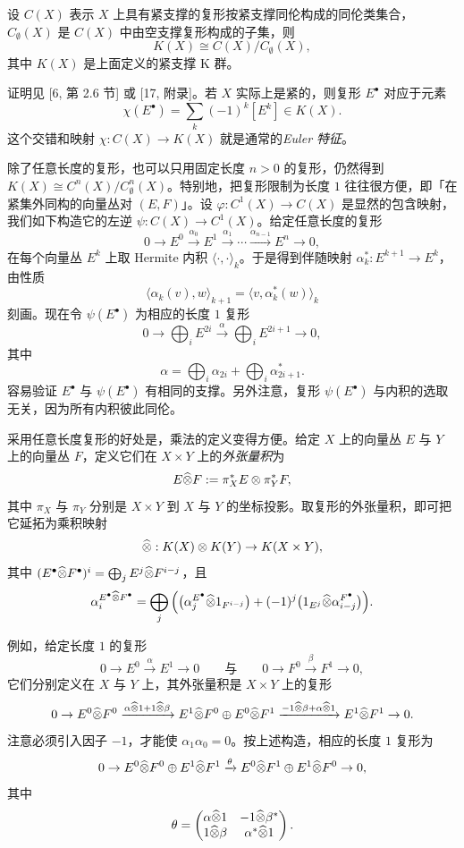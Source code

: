 \begin{claim}
设 $C(X)$ 表示 $X$ 上具有紧支撑的复形按紧支撑同伦构成的同伦类集合，$C_\emptyset(X)$ 是 $C(X)$ 中由空支撑复形构成的子集，则
\[
K(X)\cong C(X)/C_\emptyset(X),
\]
其中 $K(X)$ 是上面定义的紧支撑 K 群。
\end{claim}

证明见 [6, 第 2.6 节] 或 [17, 附录]。若 $X$ 实际上是紧的，则复形 $E^\bullet$ 对应于元素
\[
\chi(E^\bullet)=\sum_k(-1)^k[E^k]\in K(X).
\]
这个交错和映射 $\chi:C(X)\to K(X)$ 就是通常的\emph{Euler 特征}。

除了任意长度的复形，也可以只用固定长度 $n>0$ 的复形，仍然得到 $K(X)\cong C^n(X)/C^n_\emptyset(X)$。特别地，把复形限制为长度 $1$ 往往很方便，即「在紧集外同构的向量丛对 $(E,F)$」。设 $\varphi:C^1(X)\to C(X)$ 是显然的包含映射，我们如下构造它的左逆 $\psi:C(X)\to C^1(X)$。给定任意长度的复形
\[
0\to E^0\xrightarrow{\alpha_0}E^1\xrightarrow{\alpha_1}\cdots
\xrightarrow{\alpha_{n-1}}E^n\to0,
\]
在每个向量丛 $E^k$ 上取 Hermite 内积 $\langle\cdot,\cdot\rangle_k$。于是得到伴随映射 $\alpha_k^*:E^{k+1}\to E^k$，由性质
\[
\langle\alpha_k(v),w\rangle_{k+1}=\langle v,\alpha_k^*(w)\rangle_k
\]
刻画。现在令 $\psi(E^\bullet)$ 为相应的长度 $1$ 复形
\[
0\to\bigoplus_i E^{2i}\xrightarrow{\alpha}\bigoplus_i E^{2i+1}\to0,
\]
其中
\[
\alpha=\bigoplus_i\alpha_{2i}+\bigoplus_i\alpha_{2i+1}^*.
\]
容易验证 $E^\bullet$ 与 $\psi(E^\bullet)$ 有相同的支撑。另外注意，复形 $\psi(E^\bullet)$ 与内积的选取无关，因为所有内积彼此同伦。



采用任意长度复形的好处是，乘法的定义变得方便。给定 $X$ 上的向量丛 $E$ 与 $Y$ 上的向量丛 $F$，定义它们在 $X\times Y$ 上的\emph{外张量积}为
\[
E\widehat{\otimes} F:=\pi_X^*E\otimes\pi_Y^*F,
\]
其中 $\pi_X$ 与 $\pi_Y$ 分别是 $X\times Y$ 到 $X$ 与 $Y$ 的坐标投影。取复形的外张量积，即可把它延拓为乘积映射
\[
\widehat{\otimes}:K(X)\otimes K(Y)\to K(X\times Y),
\]
其中 $(E^\bullet\widehat{\otimes} F^\bullet)^i=\bigoplus_jE^j\widehat{\otimes} F^{i-j}$，且
\[
\alpha_i^{E^\bullet\widehat{\otimes} F^\bullet}
=\bigoplus_j\Big(\big(\alpha_j^{E^\bullet}\widehat{\otimes}1_{F^{i-j}}\big)
+(-1)^j\big(1_{E^j}\widehat{\otimes}\alpha_{i-j}^{F^\bullet}\big)\Big).
\]

例如，给定长度 $1$ 的复形
\[
0\to E^0\xrightarrow{\alpha}E^1\to0
\qquad\text{与}\qquad
0\to F^0\xrightarrow{\beta}F^1\to0,
\]
它们分别定义在 $X$ 与 $Y$ 上，其外张量积是 $X\times Y$ 上的复形
\[
0\to E^0\widehat{\otimes} F^0
\xrightarrow{\alpha\widehat{\otimes}1+1\widehat{\otimes}\beta}
E^1\widehat{\otimes} F^0\oplus E^0\widehat{\otimes} F^1
\xrightarrow{-1\widehat{\otimes}\beta+\alpha\widehat{\otimes}1}
E^1\widehat{\otimes} F^1\to0 .
\]
注意必须引入因子 $-1$，才能使 $\alpha_1\alpha_0=0$。按上述构造，相应的长度 $1$ 复形为
\[
0\to E^0\widehat{\otimes} F^0\oplus E^1\widehat{\otimes} F^1
\xrightarrow{\theta}
E^0\widehat{\otimes} F^1\oplus E^1\widehat{\otimes} F^0\to0,
\]
其中
\[
\theta=
\begin{pmatrix}
\alpha\widehat{\otimes}1 & -1\widehat{\otimes}\beta^*\\
1\widehat{\otimes}\beta & \alpha^*\widehat{\otimes}1
\end{pmatrix}.
\]

